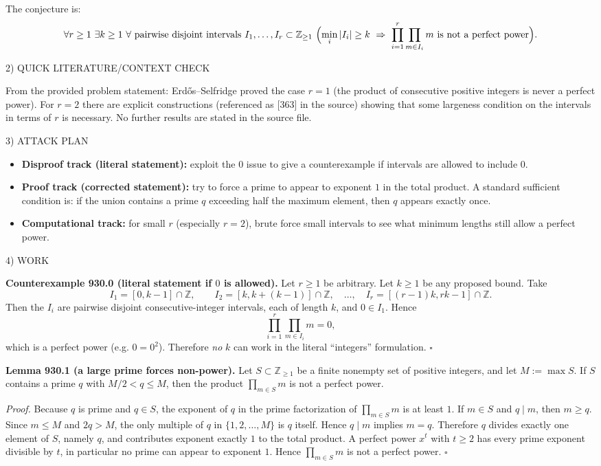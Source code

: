 The conjecture is:
\[
\forall r\ge 1\ \exists k\ge 1\ \forall\text{ pairwise disjoint intervals }I_1,\dots,I_r\subset\mathbb Z_{\ge1}
\ \Bigl(\min_i |I_i|\ge k\ \Rightarrow\ \prod_{i=1}^r\prod_{m\in I_i} m\ \text{is not a perfect power}\Bigr).
\]

2) QUICK LITERATURE/CONTEXT CHECK

From the provided problem statement: Erd\H{o}s--Selfridge proved the case $r=1$ (the product of consecutive positive integers is never a perfect power). For $r=2$ there are explicit constructions (referenced as [363] in the source) showing that some largeness condition on the intervals in terms of $r$ is necessary. No further results are stated in the source file.

3) ATTACK PLAN

\begin{itemize}
\item \textbf{Disproof track (literal statement):} exploit the $0$ issue to give a counterexample if intervals are allowed to include $0$.
\item \textbf{Proof track (corrected statement):} try to force a prime to appear to exponent $1$ in the total product. A standard sufficient condition is: if the union contains a prime $q$ exceeding half the maximum element, then $q$ appears exactly once.
\item \textbf{Computational track:} for small $r$ (especially $r=2$), brute force small intervals to see what minimum lengths still allow a perfect power.
\end{itemize}

4) WORK

\textbf{Counterexample 930.0 (literal statement if $0$ is allowed).}
Let $r\ge 1$ be arbitrary. Let $k\ge 1$ be any proposed bound. Take
\[
I_1=[0,k-1]\cap\mathbb Z,\qquad I_2=[k,k+(k-1)]\cap\mathbb Z,\quad\dots,\quad I_r=[(r-1)k,rk-1]\cap\mathbb Z.
\]
Then the $I_i$ are pairwise disjoint consecutive-integer intervals, each of length $k$, and $0\in I_1$. Hence
\[
\prod_{i=1}^r\prod_{m\in I_i} m = 0,
\]
which is a perfect power (e.g. $0=0^2$). Therefore \emph{no} $k$ can work in the literal ``integers'' formulation.
\hfill$\square$

\medskip
\textbf{Lemma 930.1 (a large prime forces non-power).}
Let $S\subset\mathbb Z_{\ge 1}$ be a finite nonempty set of positive integers, and let $M:=\max S$. If $S$ contains a prime $q$ with $M/2<q\le M$, then the product $\prod_{m\in S} m$ is not a perfect power.

\emph{Proof.}
Because $q$ is prime and $q\in S$, the exponent of $q$ in the prime factorization of $\prod_{m\in S} m$ is at least $1$.
If $m\in S$ and $q\mid m$, then $m\ge q$. Since $m\le M$ and $2q>M$, the only multiple of $q$ in $\{1,2,\dots,M\}$ is $q$ itself. Hence $q\mid m$ implies $m=q$.
Therefore $q$ divides exactly one element of $S$, namely $q$, and contributes exponent exactly $1$ to the total product.
A perfect power $x^t$ with $t\ge 2$ has every prime exponent divisible by $t$, in particular no prime can appear to exponent $1$. Hence $\prod_{m\in S} m$ is not a perfect power.
\hfill$\square$

